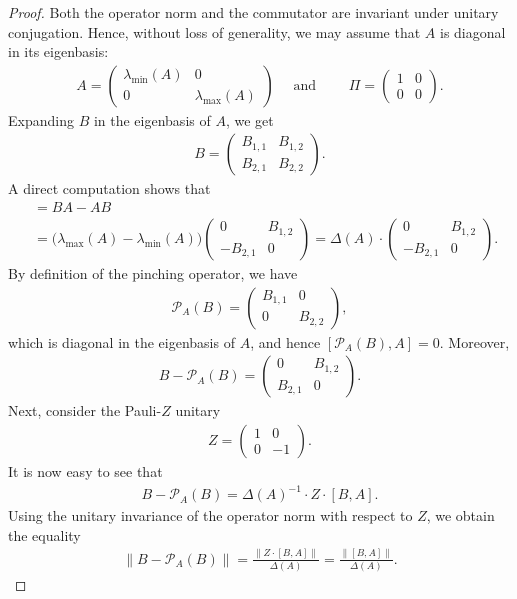 \documentclass[11pt]{article}
\theoremstyle{plain}
\begin{document}
\begin{proof}
Both the operator norm and the commutator are invariant under unitary conjugation. Hence, without loss of generality, we may assume that $A$ is diagonal in its eigenbasis:
\begin{align}
A =
\begin{pmatrix}
\lambda_{\min}(A) & 0 \\
0 & \lambda_{\max}(A)
\end{pmatrix} \quad \text{ and } \quad
\quad
\Pi =
\begin{pmatrix}
1 & 0 \\
0 & 0
\end{pmatrix}.
\end{align}
Expanding $B$ in the eigenbasis of $A$, we get
\begin{align}
B =
\begin{pmatrix}
B_{1,1} & B_{1,2} \\
B_{2,1} & B_{2,2}
\end{pmatrix}.
\end{align}
A direct computation shows that
\begin{align}
[B,A]
&= BA - AB \\
&= \bigl(\lambda_{\max}(A) - \lambda_{\min}(A)\bigr)
\begin{pmatrix}
0 & B_{1,2} \\
-B_{2,1} & 0
\end{pmatrix}
= \Delta(A) \cdot
\begin{pmatrix}
0 & B_{1,2} \\
-B_{2,1} & 0
\end{pmatrix}.
\end{align}
By definition of the pinching operator, we have
\begin{align}
\mathcal{P}_A(B)
=
\begin{pmatrix}
B_{1,1} & 0 \\
0 & B_{2,2}
\end{pmatrix},
\end{align}
which is diagonal in the eigenbasis of $A$, and hence $[\mathcal{P}_A(B),A]=0$. Moreover,
\begin{align}
B - \mathcal{P}_A(B)
=
\begin{pmatrix}
0 & B_{1,2} \\
B_{2,1} & 0
\end{pmatrix}.
\end{align}
Next, consider the Pauli-$Z$ unitary
\begin{align}
Z=\begin{pmatrix}
1 & 0 \\
0 & -1
\end{pmatrix}.  
\end{align}
It is now easy to see that
\begin{align}
B - \mathcal{P}_A(B) = \Delta(A)^{-1}\cdot Z \cdot [B,A].
\end{align}
Using the unitary invariance of the operator norm with respect to $Z$,
we obtain the equality
\begin{align}
\|B - \mathcal{P}_A(B)\|
= \frac{\|Z\cdot [B,A]\|}{\Delta(A)} = \frac{\|[B,A]\|}{\Delta(A)}.
\end{align}
\end{proof}
\end{document}
